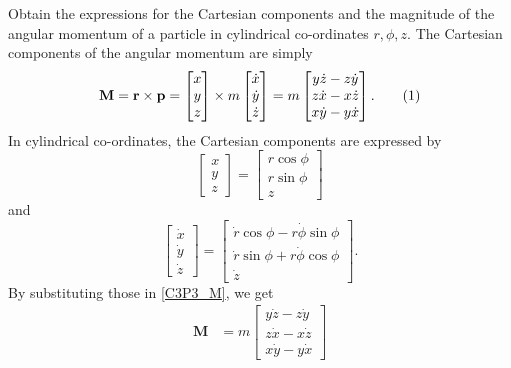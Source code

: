 \begin{problem}
{
Obtain the expressions for the Cartesian components and the magnitude of the angular momentum of a particle in cylindrical co-ordinates $r,\phi,z$.
}
{
The Cartesian components of the angular momentum are simply
\begin{equation*}
    \mathbf{M} = \mathbf{r} \times \mathbf{p} = \begin{bmatrix} x \\ y \\ z \end{bmatrix} \times m \begin{bmatrix} \Dot{x} \\ \Dot{y} \\ \Dot{z} \end{bmatrix} = m \begin{bmatrix} y \Dot{z} - z \Dot{y} \\ z \Dot{x} - x \Dot{z} \\ x \Dot{y} - y \Dot{x} \end{bmatrix} . \numberthis \label{C3P3_M}
\end{equation*}
In cylindrical co-ordinates, the Cartesian components are expressed by
\begin{equation*}
    \begin{bmatrix} x \\ y \\ z \end{bmatrix} = \begin{bmatrix} r \cos{\phi} \\ r \sin{\phi} \\ z \end{bmatrix}
\end{equation*}
and
\begin{equation*}
    \begin{bmatrix} \Dot{x} \\ \Dot{y} \\ \Dot{z} \end{bmatrix} = \begin{bmatrix} \Dot{r}\cos{\phi} - r\Dot{\phi}\sin{\phi} \\ \Dot{r}\sin{\phi} + r\Dot{\phi}\cos{\phi} \\ \Dot{z} \end{bmatrix}.
\end{equation*}
By substituting those in \eqref{C3P3_M}, we get
\begin{align*}
    \mathbf{M} &= m \begin{bmatrix} y \Dot{z} - z \Dot{y} \\ z \Dot{x} - x \Dot{z} \\ x \Dot{y} - y \Dot{x} \end{bmatrix} \\

\end{align*}}
\end{problem}
